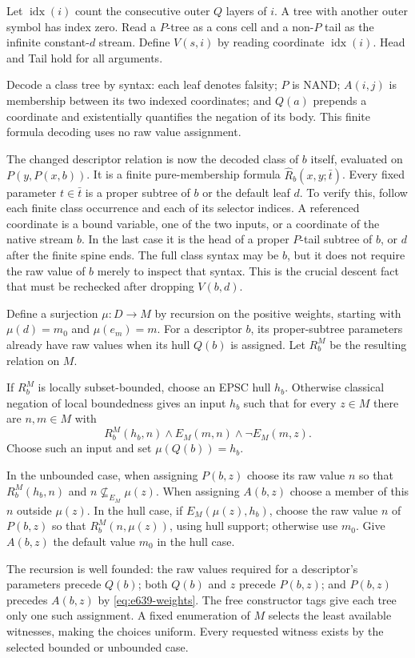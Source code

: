 Let $\operatorname{idx}(i)$ count the consecutive outer $Q$ layers
of $i$.  A tree with another outer symbol has index zero.
Read a $P$-tree as a cons cell and a non-$P$ tail as the infinite
constant-$d$ stream.  Define $V(s,i)$ by reading coordinate
$\operatorname{idx}(i)$.  Head and Tail hold for all arguments.

Decode a class tree by syntax: each leaf denotes falsity; $P$
is NAND; $A(i,j)$ is membership between its two indexed coordinates;
and $Q(a)$ prepends a coordinate and existentially quantifies the
negation of its body.  This finite formula decoding uses no raw
value assignment.

The changed descriptor relation is now the decoded class of $b$
itself, evaluated on $P(y,P(x,b))$.  It is a finite pure-membership
formula $\widehat R_b(x,y;\bar t)$.  Every fixed parameter
$t\in\bar t$ is a proper subtree of $b$ or the default leaf $d$.
To verify this, follow each finite class occurrence and each of its
selector indices.  A referenced coordinate is a bound variable,
one of the two inputs, or a coordinate of the native stream $b$.
In the last case it is the head of a proper $P$-tail subtree of
$b$, or $d$ after the finite spine ends.  The full class syntax
may be $b$, but it does not require the raw value of $b$ merely
to inspect that syntax.  This is the crucial descent fact that
must be rechecked after dropping $V(b,d)$.

Define a surjection $\mu:D\to M$ by recursion on the positive
weights, starting with $\mu(d)=m_0$ and $\mu(e_m)=m$.
For a descriptor $b$, its proper-subtree parameters already have
raw values when its hull $Q(b)$ is assigned.  Let $R_b^M$ be the
resulting relation on $M$.

If $R_b^M$ is locally subset-bounded, choose an EPSC hull $h_b$.
Otherwise classical negation of local boundedness gives an input
$h_b$ such that for every $z\in M$ there are $n,m\in M$ with
\[
 R_b^M(h_b,n)\land E_M(m,n)\land\neg E_M(m,z).
\]
Choose such an input and set $\mu(Q(b))=h_b$.

In the unbounded case, when assigning $P(b,z)$ choose its raw
value $n$ so that $R_b^M(h_b,n)$ and
$n\not\subseteq_{E_M}\mu(z)$.  When assigning $A(b,z)$ choose
a member of this $n$ outside $\mu(z)$.
In the hull case, if $E_M(\mu(z),h_b)$, choose the raw value
$n$ of $P(b,z)$ so that $R_b^M(n,\mu(z))$, using hull support;
otherwise use $m_0$.  Give $A(b,z)$ the default value $m_0$
in the hull case.

The recursion is well founded: the raw values required for a
descriptor's parameters precede $Q(b)$; both $Q(b)$ and $z$
precede $P(b,z)$; and $P(b,z)$ precedes $A(b,z)$ by
\eqref{eq:e639-weights}.  The free constructor tags give each
tree only one such assignment.  A fixed enumeration of $M$
selects the least available witnesses, making the choices uniform.
Every requested witness exists by the selected bounded or
unbounded case.


